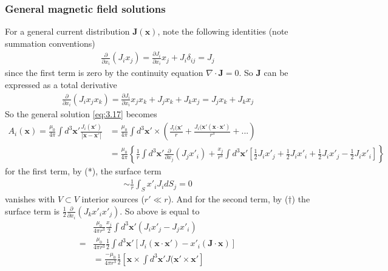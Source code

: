 \documentclass[a4paper]{article}
\begin{document}
\subsubsection{General magnetic field solutions}
For a general current distribution $\mathbf{J}(\mathbf{x})$, note the following identities (note summation conventions)
\begin{equation*}\tag{*}
\begin{aligned}
\frac{\partial}{\partial x_i}(J_i x_j) = \frac{\partial J_i}{\partial x_i} x_j + J_i \delta_{ij} = J_j
\end{aligned}
\end{equation*}
since the first term is zero by the continuity equation $\nabla \cdot \mathbf{J}=0$. So $\mathbf{J}$ can be expressed as a total derivative
\begin{equation*}\tag{$\dagger$}
\begin{aligned}
\frac{\partial}{\partial x_i}(J_i x_j x_k) = \frac{\partial J_i}{\partial x_i} x_j x_k + J_j x_k + J_k x_j = J_j x_k + J_k x_j
\end{aligned}
\end{equation*}
So the general solution \eqref{eq:3.17} becomes
\begin{equation*}
\begin{aligned}
A_i (\mathbf{x}) = \frac{\mu_0}{4\pi} \int d^3 \mathbf{x}' \frac{J_i(\mathbf{x}')}{|\mathbf{x}-\mathbf{x}'|} &= \frac{\mu_0}{4\pi} \int d^3 \mathbf{x}' \times \left(\frac{J_i(\mathbf{x}'}{r} + \frac{J_i(\mathbf{x}' (\mathbf{x} \cdot \mathbf{x}')}{r^3}+...\right)\\
&=\frac{\mu_0}{4\pi} \left\{\frac{1}{r}\int d^3 \mathbf{x}' \frac{\partial}{\partial x_j} (J_j x'_i) + 
\frac{x_j}{r^3} \int d^3 \mathbf{x}' \left[\frac{1}{2} J_i x'_j + \frac{1}{2} J_i x'_i + \frac{1}{2} J_i x'_j - \frac{1}{2} J_i x'_i \right]\right\}
\end{aligned}
\end{equation*}
for the first term, by (*), the surface term
\begin{equation*}
\begin{aligned}
\sim \frac{1}{r}\int_S x'_i J_i dS_j = 0
\end{aligned}
\end{equation*}
vanishes with $V \subset V$ interior sources ($r' \ll r$). And for the second term, by ($\dagger$) the surface term is $\frac{1}{2} \frac{\partial}{\partial x_i} (J_k x'_i x'_j)$. So above is equal to
\begin{equation*}
\begin{aligned}
&\frac{\mu_0}{4\pi r^3} \frac{x_j}{2} \int d^3 \mathbf{x}' (J_i x'_j - J_j x'_i)\\
=& \frac{\mu_0}{4\pi r^3} \frac{1}{2} \int d^3 \mathbf{x}' \left[J_i (\mathbf{x}\cdot \mathbf{x}') - x'_i (\mathbf{J} \cdot \mathbf{x})\right]\\
&= \frac{-\mu_0}{4\pi r^3} \frac{1}{2} \left[\mathbf{x} \times \int d^3 \mathbf{x}' J(\mathbf{x}' \times \mathbf{x}'\right]
\end{aligned}
\end{equation*}
\end{document}
